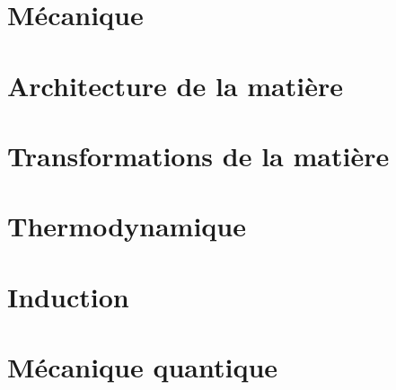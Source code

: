 \documentclass[a4paper, 12pt, garamond]{book}
\begin{document}
\part{Mécanique}








\part{Architecture de la matière}



\part{Transformations de la matière}




\part{Thermodynamique}




\part{Induction}




\part{Mécanique quantique}

% 
% 
\end{document}
